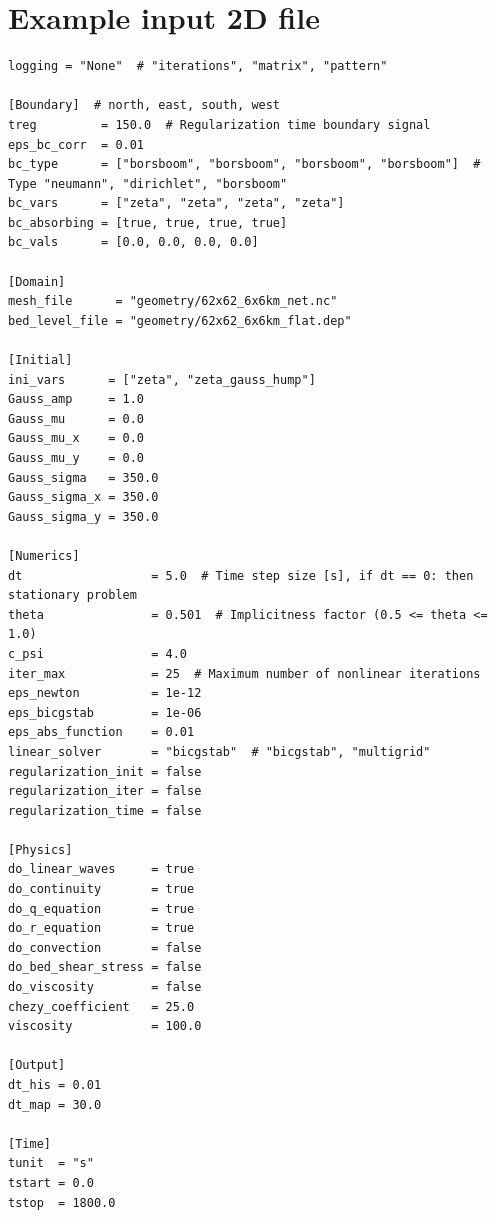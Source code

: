 \documentclass[subfooter, backcover]{mooiman_memo}
\begin{document}
\section{Example input 2D file}\label{sec:example_input_2d}
\begin{Verbatim}[fontsize=\scriptsize]
logging = "None"  # "iterations", "matrix", "pattern"

[Boundary]  # north, east, south, west
treg         = 150.0  # Regularization time boundary signal
eps_bc_corr  = 0.01
bc_type      = ["borsboom", "borsboom", "borsboom", "borsboom"]  # Type "neumann", "dirichlet", "borsboom"
bc_vars      = ["zeta", "zeta", "zeta", "zeta"]
bc_absorbing = [true, true, true, true]
bc_vals      = [0.0, 0.0, 0.0, 0.0]

[Domain]
mesh_file      = "geometry/62x62_6x6km_net.nc"
bed_level_file = "geometry/62x62_6x6km_flat.dep"

[Initial]
ini_vars      = ["zeta", "zeta_gauss_hump"]
Gauss_amp     = 1.0
Gauss_mu      = 0.0
Gauss_mu_x    = 0.0
Gauss_mu_y    = 0.0
Gauss_sigma   = 350.0
Gauss_sigma_x = 350.0
Gauss_sigma_y = 350.0

[Numerics]
dt                  = 5.0  # Time step size [s], if dt == 0: then stationary problem
theta               = 0.501  # Implicitness factor (0.5 <= theta <= 1.0)
c_psi               = 4.0
iter_max            = 25  # Maximum number of nonlinear iterations
eps_newton          = 1e-12
eps_bicgstab        = 1e-06
eps_abs_function    = 0.01
linear_solver       = "bicgstab"  # "bicgstab", "multigrid"
regularization_init = false
regularization_iter = false
regularization_time = false

[Physics]
do_linear_waves     = true
do_continuity       = true
do_q_equation       = true
do_r_equation       = true
do_convection       = false
do_bed_shear_stress = false
do_viscosity        = false
chezy_coefficient   = 25.0
viscosity           = 100.0

[Output]
dt_his = 0.01
dt_map = 30.0

[Time]
tunit  = "s"
tstart = 0.0
tstop  = 1800.0
\end{Verbatim}
\printallbibliography
\end{document}
